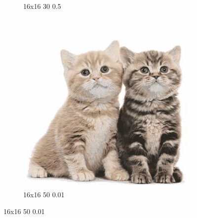 \documentclass[12pt,a4paper]{article}
\begin{document}
\begin{figure}[htb]
\begin{subfigure}{0.25\textwidth}
  \caption{16x16 30 0.5}
  \label{fig:4}
\end{subfigure}\hfil %
\begin{subfigure}{0.25\textwidth}
  \includegraphics[width=\linewidth]{images/big/16-16-50-001}
  \caption{16x16 50 0.01}
  \label{fig:5}
\end{subfigure}\hfil %


\end{figure}
\end{document}
